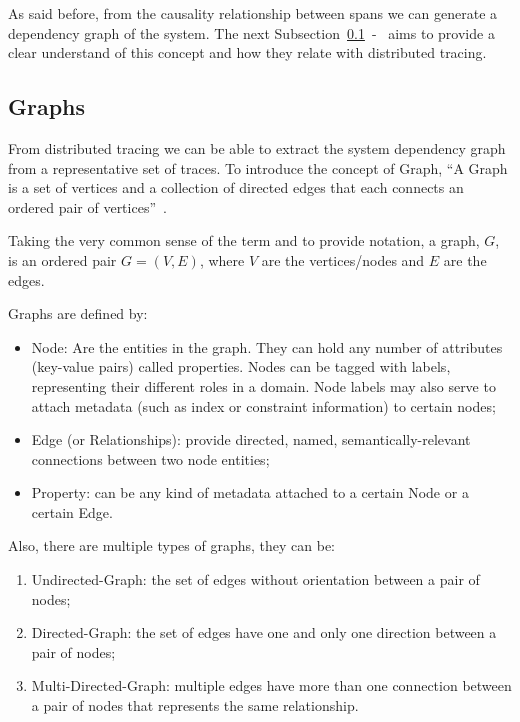 As said before, from the causality relationship between spans we can generate a dependency graph of the system. The next Subsection~\ref{subsec:graphs}~-~ aims to provide a clear understand of this concept and how they relate with distributed tracing.

\subsection{Graphs}
\label{subsec:graphs}

From distributed tracing we can be able to extract the system dependency graph from a representative set of traces. To introduce the concept of Graph, ``A Graph is a set of vertices and a collection of directed edges that each connects an ordered pair of vertices''~\cite{graph_standard_definition}.

Taking the very common sense of the term and to provide notation, a graph, $G$, is an ordered pair $G = (V, E)$, where $V$ are the vertices/nodes and $E$ are the edges.

Graphs are defined by:

\begin{itemize}
    \item Node: Are the entities in the graph. They can hold any number of attributes (key-value pairs) called properties. Nodes can be tagged with labels, representing their different roles in a domain. Node labels may also serve to attach metadata (such as index or constraint information) to certain nodes;
    \item Edge (or Relationships): provide directed, named, semantically-relevant connections between two node entities;
    \item Property: can be any kind of metadata attached to a certain Node or a certain Edge.
\end{itemize}

Also, there are multiple types of graphs, they can be:

\begin{enumerate}
    \item Undirected-Graph: the set of edges without orientation between a pair of nodes;
    \item Directed-Graph: the set of edges have one and only one direction between a pair of nodes;
    \item Multi-Directed-Graph: multiple edges have more than one connection between a pair of nodes that represents the same relationship.
\end{enumerate}

